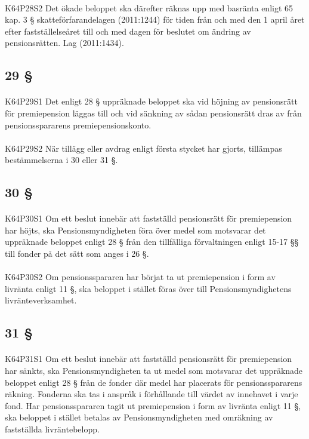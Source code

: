 \documentclass[a4paper,notitlepage,openany,10pt]{book}
\begin{document}
\paragraph*{}
{\tiny K64P28S2}
Det ökade beloppet ska därefter räknas upp med basränta enligt 65 kap. 3 § skatteförfarandelagen (2011:1244) för tiden från och med den 1 april året efter fastställelseåret till och med dagen för beslutet om ändring av pensionsrätten.
Lag (2011:1434).
\subsection*{29 §}
\paragraph*{}
{\tiny K64P29S1}
Det enligt 28 § uppräknade beloppet ska vid höjning av pensionsrätt för premiepension läggas till och vid sänkning av sådan pensionsrätt dras av från pensionsspararens premiepensionskonto.
\paragraph*{}
{\tiny K64P29S2}
När tillägg eller avdrag enligt första stycket har gjorts, tillämpas bestämmelserna i 30 eller 31 §.
\subsection*{30 §}
\paragraph*{}
{\tiny K64P30S1}
Om ett beslut innebär att fastställd pensionsrätt för premiepension har höjts, ska Pensionsmyndigheten föra över medel som motsvarar det uppräknade beloppet enligt 28 § från den tillfälliga förvaltningen enligt 15-17 §§ till fonder på det sätt som anges i 26 §.
\paragraph*{}
{\tiny K64P30S2}
Om pensionsspararen har börjat ta ut premiepension i form av livränta enligt 11 §, ska beloppet i stället föras över till Pensionsmyndighetens livränteverksamhet.
\subsection*{31 §}
\paragraph*{}
{\tiny K64P31S1}
Om ett beslut innebär att fastställd pensionsrätt för premiepension har sänkts, ska Pensionsmyndigheten ta ut medel som motsvarar det uppräknade beloppet enligt 28 § från de fonder där medel har placerats för pensionsspararens räkning.
Fonderna ska tas i anspråk i förhållande till värdet av innehavet i varje fond. Har pensionsspararen tagit ut premiepension i form av livränta enligt 11 §, ska beloppet i stället betalas av Pensionsmyndigheten med omräkning av fastställda livräntebelopp.
\end{document}
